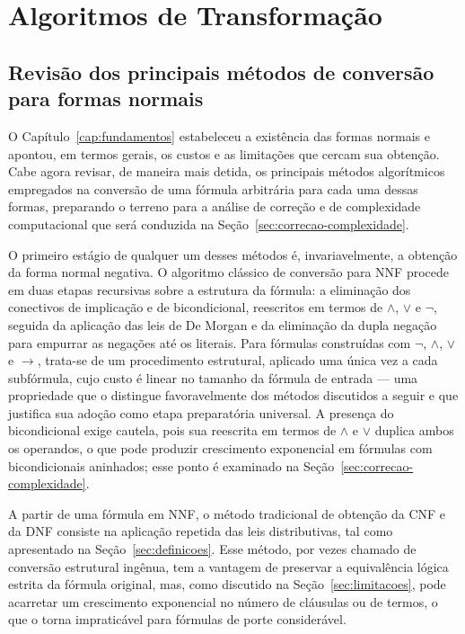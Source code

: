 \documentclass[12pt,a4paper,oneside]{report}
\theoremstyle{tituloplain}
\theoremstyle{titulodef}
\begin{document}
\chapter{Algoritmos de Transformação}\label{cap:algoritmos}
\section{Revisão dos principais métodos de conversão para formas normais}\label{sec:revisao-metodos}

O Capítulo~\ref{cap:fundamentos} estabeleceu a existência das formas normais e apontou, em termos gerais, os custos e as limitações que cercam sua obtenção. Cabe agora revisar, de maneira mais detida, os principais métodos algorítmicos empregados na conversão de uma fórmula arbitrária para cada uma dessas formas, preparando o terreno para a análise de correção e de complexidade computacional que será conduzida na Seção~\ref{sec:correcao-complexidade}.
 
O primeiro estágio de qualquer um desses métodos é, invariavelmente, a obtenção da forma normal negativa. O algoritmo clássico de conversão para NNF procede em duas etapas recursivas sobre a estrutura da fórmula: a eliminação dos conectivos de implicação e de bicondicional, reescritos em termos de $\wedge$, $\vee$ e $\neg$, seguida da aplicação das leis de De Morgan e da eliminação da dupla negação para empurrar as negações até os literais. Para fórmulas construídas com $\neg$, $\wedge$, $\vee$ e $\rightarrow$, trata-se de um procedimento estrutural, aplicado uma única vez a cada subfórmula, cujo custo é linear no tamanho da fórmula de entrada — uma propriedade que o distingue favoravelmente dos métodos discutidos a seguir e que justifica sua adoção como etapa preparatória universal. A presença do bicondicional exige cautela, pois sua reescrita em termos de $\wedge$ e $\vee$ duplica ambos os operandos, o que pode produzir crescimento exponencial em fórmulas com bicondicionais aninhados; esse ponto é examinado na Seção~\ref{sec:correcao-complexidade}.
 
A partir de uma fórmula em NNF, o método tradicional de obtenção da CNF e da DNF consiste na aplicação repetida das leis distributivas, tal como apresentado na Seção~\ref{sec:definicoes}. Esse método, por vezes chamado de conversão estrutural ingênua, tem a vantagem de preservar a equivalência lógica estrita da fórmula original, mas, como discutido na Seção~\ref{sec:limitacoes}, pode acarretar um crescimento exponencial no número de cláusulas ou de termos, o que o torna impraticável para fórmulas de porte considerável.
 
\end{document}

